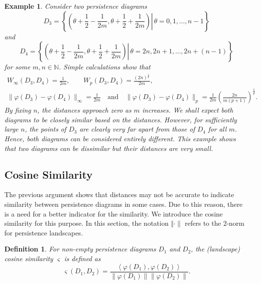 \documentclass[sn-mathphys-num]{sn-jnl}%
\theoremstyle{thmstyleone}%
\theoremstyle{thmstyletwo}%
\newtheorem{example}{Example}%
\theoremstyle{thmstylethree}%
\newtheorem{definition}{Definition}%
\begin{document}
\begin{example}\label{example: distance not accurate 2}
	Consider two persistence diagrams
	\begin{equation*}
		D_3=\left\{\left.\left(\theta+\frac{1}{2}-\frac{1}{2 m}, \theta+\frac{1}{2}+\frac{1}{2 m}\right) \right\rvert\, \theta=0,1, \ldots, n-1\right\}
	\end{equation*}
	and
	\begin{equation*}
		D_4=\left\{\left.\left(\theta+\frac{1}{2}-\frac{1}{2 m}, \theta+\frac{1}{2}+\frac{1}{2 m}\right) \right\rvert\, \theta=2n, 2n+1, \ldots, 2n+(n-1)\right\}
	\end{equation*}
	for some $m, n \in \mathbb{N}$. Simple calculations show that
	\begin{gather*}
		W_{\infty}(D_3, D_4)=\frac{1}{2 m}, \qquad W_p(D_3, D_4)=\frac{(2 n)^{\frac{1}{p}}}{2 m}, \\
		\|\varphi(D_3)-\varphi(D_4)\|_{\infty}=\frac{1}{2 m} \quad \textrm{and} \quad \|\varphi(D_3)-\varphi(D_4)\|_p=\frac{1}{2 m}\left(\frac{2 n}{m(p+1)}\right)^{\frac{1}{p}}.
	\end{gather*}
	By fixing $n$, the distances approach zero as $m$ increases. We shall expect both diagrams to be closely similar based on the distances. However, for sufficiently large $n$, the points of $D_3$ are clearly very far apart from those of $D_4$ for all $m$. Hence, both diagrams can be considered entirely different. This example shows that two diagrams can be dissimilar but their distances are very small.
\end{example}

\subsection{Cosine Similarity}
The previous argument shows that distances may not be accurate to indicate similarity between persistence diagrams in some cases. Due to this reason, there is a need for a better indicator for the similarity. We introduce the cosine similarity for this purpose. In this section, the notation $\Vert \cdot \rVert$ refers to the $2$-norm for persistence landscapes.

\begin{definition}
	For non-empty persistence diagrams $D_1$ and $D_2$, the \emph{(landscape) cosine similarity} $\varsigma$ is defined as
	\begin{equation*}
		\varsigma(D_1, D_2)=\frac{\left\langle\varphi(D_1), \varphi(D_2)\right\rangle}{\left\|\varphi(D_1)\right\|\left\|\varphi(D_2)\right\|}.
	\end{equation*}
\end{definition}
\end{document}
